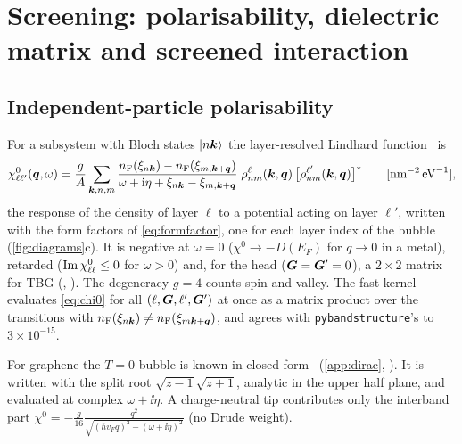 \section{Screening: polarisability, dielectric matrix and screened interaction}
\label{sec:screening}

\subsection{Independent-particle polarisability}

For a subsystem with Bloch states $|n\bm k\rangle$ the layer-resolved Lindhard function~\cite{GiulianiVignale} is
\begin{equation}
\chi^0_{\ell\ell'}(\bm q,\omega)=\frac{g}{A}\sum_{\bm k,n,m}
\frac{n_{\rm F}(\xi_{n\bm k})-n_{\rm F}(\xi_{m,\bm k+\bm q})}{\omega+\mathrm i\eta+\xi_{n\bm k}-\xi_{m,\bm k+\bm q}}\;
\rho^\ell_{nm}(\bm k,\bm q)\,\bigl[\rho^{\ell'}_{nm}(\bm k,\bm q)\bigr]^*
\qquad[\text{nm}^{-2}\,\text{eV}^{-1}],
\label{eq:chi0}
\end{equation}
the response of the density of layer $\ell$ to a potential acting on layer $\ell'$, written with the form factors of
\cref{eq:formfactor}, one for each layer index of the bubble (\cref{fig:diagrams}c). It is negative at
$\omega=0$ ($\chi^0\to-D(E_F)$ for $q\to0$ in a metal), retarded ($\operatorname{Im}\chi^0_{\ell\ell}\le0$ for
$\omega>0$) and, for the head ($\bm G=\bm G'=0$), a $2\times2$ matrix for TBG
(, ). The degeneracy $g=4$ counts spin and valley.
The fast kernel evaluates \cref{eq:chi0} for all $(\ell,\bm G,\ell',\bm G')$ at once as a matrix product over the
transitions with $n_{\rm F}(\xi_{n\bm k})\neq n_{\rm F}(\xi_{m\bm k+\bm q})$, and agrees with \texttt{pybandstructure}'s
 to $3\times10^{-15}$.

For graphene the $T=0$ bubble is known in closed form~\cite{Wunsch2006} (\cref{app:dirac},
). It is written with the split root $\sqrt{z-1}\sqrt{z+1}$, analytic in the upper
half plane, and evaluated at complex $\omega+\ii\eta$. A charge-neutral tip contributes only the interband part
$\chi^0=-\frac{g}{16}\frac{q^2}{\sqrt{(\hbar v_Fq)^2-(\omega+\ii\eta)^2}}$ (no Drude weight).

